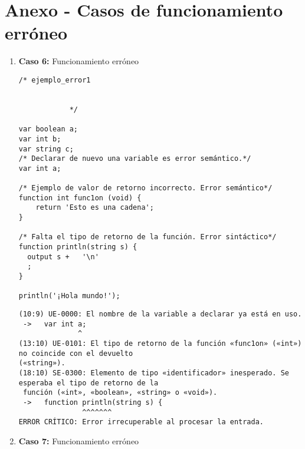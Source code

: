 \newpage

\section{Anexo - Casos de funcionamiento erróneo}
\begin{enumerate}





    \item \textbf{Caso 6:} Funcionamiento erróneo
    \begin{tcolorbox}[title={Código fuente}, colback=white]
        \begin{lstlisting}
/* ejemplo_error1


            */

var boolean a;
var int b;
var string c;
/* Declarar de nuevo una variable es error semántico.*/
var int a;

/* Ejemplo de valor de retorno incorrecto. Error semántico*/
function int func1on (void) {
    return 'Esto es una cadena';
}

/* Falta el tipo de retorno de la función. Error sintáctico*/
function println(string s) {
  output s +   '\n'
  ;
}

println('¡Hola mundo!');
        \end{lstlisting}      
    \end{tcolorbox}

    \begin{tcolorbox}[title={Errores detectados}, colback=white]
        \begin{lstlisting}
(10:9) UE-0000: El nombre de la variable a declarar ya está en uso.
 ->   var int a;
              ^
(13:10) UE-0101: El tipo de retorno de la función «func1on» («int») no coincide con el devuelto
(«string»).
(18:10) SE-0300: Elemento de tipo «identificador» inesperado. Se esperaba el tipo de retorno de la
 función («int», «boolean», «string» o «void»).
 ->   function println(string s) {
               ^^^^^^^
ERROR CRÍTICO: Error irrecuperable al procesar la entrada.
        \end{lstlisting}
    \end{tcolorbox}





    \item \textbf{Caso 7:} Funcionamiento erróneo
    \begin{tcolorbox}[title={Código fuente}, colback=white]
        \begin{lstlisting}



\end{lstlisting}
\end{tcolorbox}
\end{enumerate}
